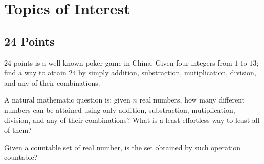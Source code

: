 \documentclass[12pt]{article}
\begin{document}
\section{Topics of Interest}
\subsection{24 Points}
24 points is a well known poker game in China.
Given four integers from $1$ to $13$; find a way to attain $24$ by simply addition, substraction, mutiplication, division, and any of their combinations.

A natural mathematic question is: given $n$ real numbers, how many different numbers can be attained using only addition, substraction, mutiplication, division, and any of their combinations? What is a least effortless way to least all of them?

Given a countable set of real number, is the set obtained by such operation countable? 
\end{document}
